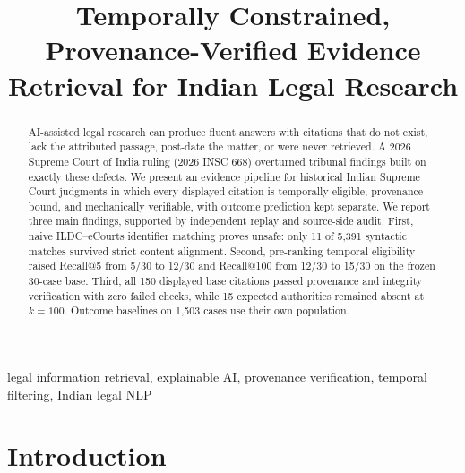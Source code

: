 \documentclass[conference]{IEEEtran}
\begin{document}
\title{Temporally Constrained, Provenance-Verified Evidence Retrieval for Indian Legal Research}

\author{
}

\maketitle

\begin{abstract}
AI-assisted legal research can produce fluent answers with citations that do not exist, lack the attributed passage, post-date the matter, or were never retrieved. A 2026 Supreme Court of India
ruling (2026 INSC 668) overturned tribunal findings built on exactly these
defects. We present an
evidence pipeline for
historical Indian Supreme Court judgments in which every displayed citation is
temporally eligible, provenance-bound, and mechanically verifiable, with outcome
prediction kept separate. We report three main findings, supported by independent replay and source-side audit. First, naive ILDC--eCourts identifier matching proves unsafe: only 11 of 5{,}391 syntactic matches survived strict content alignment.
Second, pre-ranking temporal eligibility
raised Recall@5 from
5/30 to 12/30 and Recall@100 from 12/30 to 15/30 on the frozen 30-case base.
Third, all 150 displayed base citations passed provenance and integrity
verification with zero failed checks,
while 15 expected authorities remained
absent at $k{=}100$. Outcome baselines on 1{,}503 cases use their own population.

\end{abstract}

\begin{IEEEkeywords}
legal information retrieval, explainable AI, provenance verification, temporal filtering, Indian legal NLP
\end{IEEEkeywords}

\section{Introduction}
\end{document}
